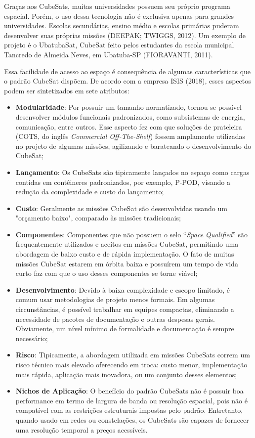 Graças aos CubeSats, muitas universidades possuem seu próprio programa espacial. Porém, o uso dessa tecnologia não é exclusiva apenas para grandes universidades. Escolas secundárias, ensino médio e escolas primárias puderam desenvolver suas próprias missões (DEEPAK; TWIGGS, 2012). Um exemplo de projeto é o UbatubaSat, CubeSat feito pelos estudantes da escola municipal Tancredo de Almeida Neves, em Ubatuba-SP (FIORAVANTI, 2011).

Essa facilidade de acesso ao espaço é consequência de algumas características que o padrão CubeSat dispõem. De acordo com a empresa ISIS (2018), esses aspectos podem ser sintetizados em sete atributos:

\begin{itemize}
	
	\item \textbf{Modularidade}: Por possuir um tamanho normatizado, tornou-se possível desenvolver módulos funcionais padronizados, como subsistemas de energia, comunicação, entre outros. Esse aspecto fez com que soluções de prateleira (COTS, do inglês \textit{Commercial Off-The-Shelf}) fossem amplamente utilizadas no projeto de algumas missões, agilizando e barateando o desenvolvimento do CubeSat;
	
	\item \textbf{Lançamento}: Os CubeSats são tipicamente lançados no espaço como cargas contidas em contêineres padronizados, por exemplo, P-POD, visando a redução da complexidade e custo do lançamento;
	\item \textbf{Custo}: Geralmente as missões CubeSat são desenvolvidas usando um "orçamento baixo", comparado às missões tradicionais;
	\item \textbf{Componentes}: Componentes que não possuem o selo “\textit{Space Qualified}” são frequentemente utilizados e aceitos em missões CubeSat, permitindo uma abordagem de baixo custo e de rápida implementação. O fato de muitas missões CubeSat estarem em órbita baixa e possuírem um tempo de vida curto faz com que o uso desses componentes se torne viável;
	\item \textbf{Desenvolvimento}: Devido à baixa complexidade e escopo limitado, é comum usar metodologias de projeto menos formais. Em algumas circunstâncias, é possível trabalhar em equipes compactas, eliminando a necessidade de pacotes de documentação e outras despesas gerais. Obviamente, um nível mínimo de formalidade e documentação é sempre necessário;
	\item \textbf{Risco}: Tipicamente, a abordagem utilizada em missões CubeSats correm um risco técnico mais elevado oferecendo em troca: custo menor, implementação mais rápida, aplicação mais inovadora, ou um conjunto desses elementos;
	\item \textbf{Nichos de Aplicação}: O benefício do padrão CubeSats não é possuir boa performance em termo de largura de banda ou resolução espacial, pois não é compatível com as restrições estruturais impostas pelo padrão. Entretanto, quando usado em redes ou constelações, os CubeSats são capazes de fornecer uma resolução temporal a preços acessíveis.
	
\end{itemize}

